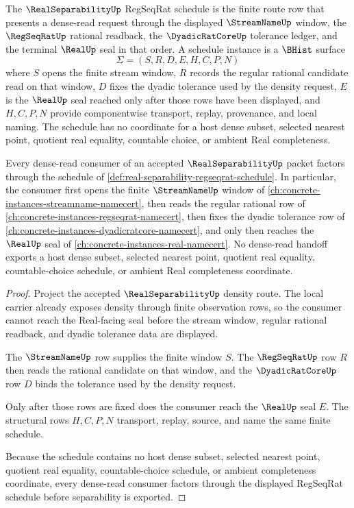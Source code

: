 \begin{definition}
\label{def:real-separability-regseqrat-schedule}
The $\RealSeparabilityUp$ RegSeqRat schedule is the finite route row that presents a dense-read request through the displayed $\StreamNameUp$ window, the $\RegSeqRatUp$ rational readback, the $\DyadicRatCoreUp$ tolerance ledger, and the terminal $\RealUp$ seal in that order. A schedule instance is a $\BHist$ surface
$$
\Sigma=(S,R,D,E,H,C,P,N)
$$
where $S$ opens the finite stream window, $R$ records the regular rational candidate read on that window, $D$ fixes the dyadic tolerance used by the density request, $E$ is the $\RealUp$ seal reached only after those rows have been displayed, and $H,C,P,N$ provide componentwise transport, replay, provenance, and local naming. The schedule has no coordinate for a host dense subset, selected nearest point, quotient real equality, countable choice, or ambient Real completeness.
\end{definition}

\begin{theorem}
\label{thm:real-separability-regseqrat-schedule-handoff}
Every dense-read consumer of an accepted $\RealSeparabilityUp$ packet factors through the schedule of \autoref{def:real-separability-regseqrat-schedule}. In particular, the consumer first opens the finite $\StreamNameUp$ window of \autoref{ch:concrete-instances-streamname-namecert}, then reads the regular rational row of \autoref{ch:concrete-instances-regseqrat-namecert}, then fixes the dyadic tolerance row of \autoref{ch:concrete-instances-dyadicratcore-namecert}, and only then reaches the $\RealUp$ seal of \autoref{ch:concrete-instances-real-namecert}. No dense-read handoff exports a host dense subset, selected nearest point, quotient real equality, countable-choice schedule, or ambient Real completeness coordinate.
\end{theorem}
\begin{proof}
Project the accepted $\RealSeparabilityUp$ density route. The local carrier already exposes density through finite observation rows, so the consumer cannot reach the Real-facing seal before the stream window, regular rational readback, and dyadic tolerance data are displayed.

The $\StreamNameUp$ row supplies the finite window $S$. The $\RegSeqRatUp$ row $R$ then reads the rational candidate on that window, and the $\DyadicRatCoreUp$ row $D$ binds the tolerance used by the density request.

Only after those rows are fixed does the consumer reach the $\RealUp$ seal $E$. The structural rows $H,C,P,N$ transport, replay, source, and name the same finite schedule.

Because the schedule contains no host dense subset, selected nearest point, quotient real equality, countable-choice schedule, or ambient completeness coordinate, every dense-read consumer factors through the displayed RegSeqRat schedule before separability is exported.
\end{proof}
